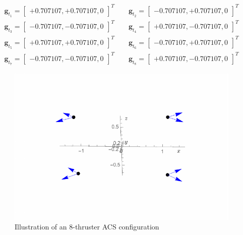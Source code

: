 \begin{gather*}
	\label{eq:th:gt}
	\bm g_{t_{1}} = \begin{bmatrix} +0.707107, +0.707107, 0  \end{bmatrix}^{T}
	\quad\quad
	\bm g_{t_{2}} = \begin{bmatrix} -0.707107, +0.707107, 0  \end{bmatrix}^{T}
	\\
	\bm g_{t_{3}} = \begin{bmatrix} -0.707107, -0.707107, 0  \end{bmatrix}^{T}
	\quad\quad
	\bm g_{t_{4}} = \begin{bmatrix} +0.707107, -0.707107, 0  \end{bmatrix}^{T}
	\\
	\bm g_{t_{5}} = \begin{bmatrix} +0.707107, +0.707107, 0 \end{bmatrix}^{T}
	\quad\quad
	\bm g_{t_{6}} = \begin{bmatrix} -0.707107, +0.707107, 0  \end{bmatrix}^{T}
	\\
	\bm g_{t_{7}} = \begin{bmatrix} -0.707107, -0.707107, 0  \end{bmatrix}^{T}
	\quad\quad
	\bm g_{t_{8}} = \begin{bmatrix} +0.707107, -0.707107, 0  \end{bmatrix}^{T}
\end{gather*}
\begin{figure}[htb]
	\centerline{
	\includegraphics[]{Figures/8ThrConfig}
	}
	\caption{Illustration of an 8-thruster ACS configuration}
	\label{fig:8ThrConfig}
\end{figure}
